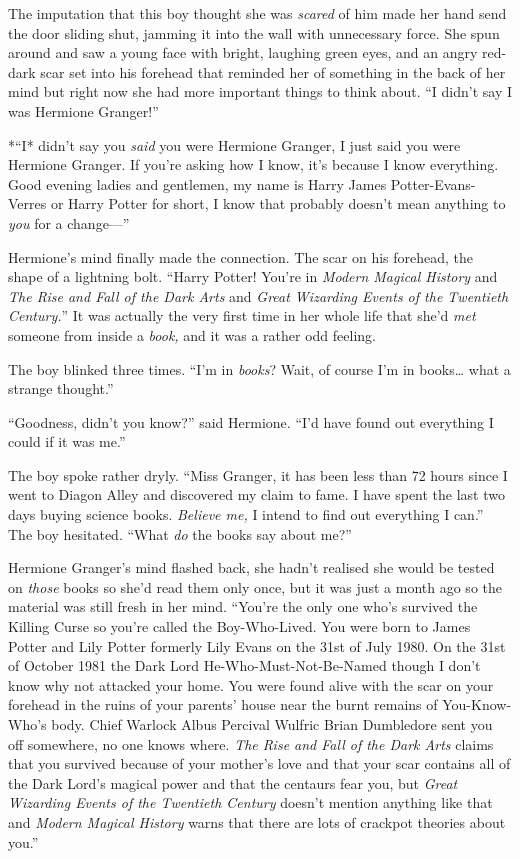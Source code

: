 The imputation that this boy thought she was \emph{scared} of him made
her hand send the door sliding shut, jamming it into the wall with
unnecessary force. She spun around and saw a young face with bright,
laughing green eyes, and an angry red-dark scar set into his forehead
that reminded her of something in the back of her mind but right now she
had more important things to think about. ``I didn't say I was Hermione
Granger!''

*``I* didn't say you \emph{said} you were Hermione Granger, I just said
you were Hermione Granger. If you're asking how I know, it's because I
know everything. Good evening ladies and gentlemen, my name is Harry
James Potter-Evans-Verres or Harry Potter for short, I know that
probably doesn't mean anything to \emph{you} for a change---''

Hermione's mind finally made the connection. The scar on his forehead,
the shape of a lightning bolt. ``Harry Potter! You're in \emph{Modern
Magical History} and \emph{The Rise and Fall of the Dark Arts} and
\emph{Great Wizarding Events of the Twentieth Century.}'' It was
actually the very first time in her whole life that she'd \emph{met}
someone from inside a \emph{book,} and it was a rather odd feeling.

The boy blinked three times. ``I'm in \emph{books}? Wait, of course I'm
in books\ldots{} what a strange thought.''

``Goodness, didn't you know?'' said Hermione. ``I'd have found out
everything I could if it was me.''

The boy spoke rather dryly. ``Miss Granger, it has been less than 72
hours since I went to Diagon Alley and discovered my claim to fame. I
have spent the last two days buying science books. \emph{Believe me,} I
intend to find out everything I can.'' The boy hesitated. ``What
\emph{do} the books say about me?''

Hermione Granger's mind flashed back, she hadn't realised she would be
tested on \emph{those} books so she'd read them only once, but it was
just a month ago so the material was still fresh in her mind. ``You're
the only one who's survived the Killing Curse so you're called the
Boy-Who-Lived. You were born to James Potter and Lily Potter formerly
Lily Evans on the 31st of July 1980. On the 31st of October 1981 the
Dark Lord He-Who-Must-Not-Be-Named though I don't know why not attacked
your home. You were found alive with the scar on your forehead in the
ruins of your parents' house near the burnt remains of You-Know-Who's
body. Chief Warlock Albus Percival Wulfric Brian Dumbledore sent you off
somewhere, no one knows where. \emph{The Rise and Fall of the Dark Arts}
claims that you survived because of your mother's love and that your
scar contains all of the Dark Lord's magical power and that the centaurs
fear you, but \emph{Great Wizarding Events of the Twentieth Century}
doesn't mention anything like that and \emph{Modern Magical History}
warns that there are lots of crackpot theories about you.''

